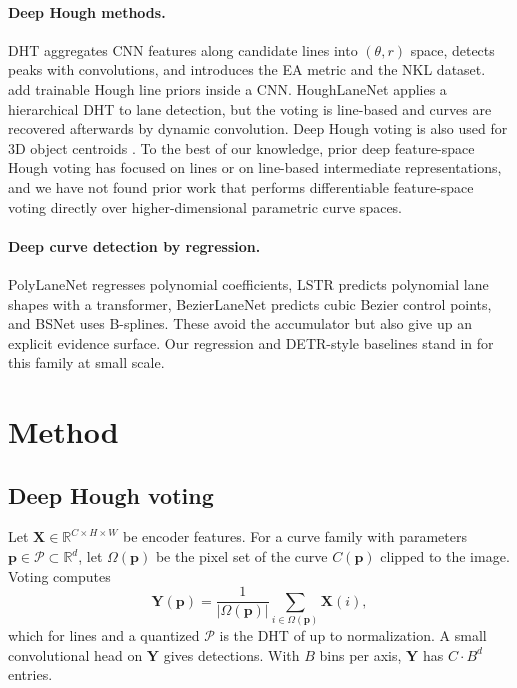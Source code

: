 \documentclass[11pt]{article}
\begin{document}
\paragraph{Deep Hough methods.}
DHT \citep{zhao2021deep} aggregates CNN features along candidate lines into $(\theta,r)$ space, detects peaks with convolutions, and introduces the EA metric and the NKL dataset. \citet{lin2020houghpriors} add trainable Hough line priors inside a CNN. HoughLaneNet \citep{houglanenet2023} applies a hierarchical DHT to lane detection, but the voting is line-based and curves are recovered afterwards by dynamic convolution. Deep Hough voting is also used for 3D object centroids \citep{qi2019votenet}. To the best of our knowledge, prior deep feature-space Hough voting has focused on lines or on line-based intermediate representations, and we have not found prior work that performs differentiable feature-space voting directly over higher-dimensional parametric curve spaces.

\paragraph{Deep curve detection by regression.}
PolyLaneNet \citep{polylanenet2020} regresses polynomial coefficients, LSTR \citep{lstr2021} predicts polynomial lane shapes with a transformer, BezierLaneNet \citep{feng2022bezier} predicts cubic Bezier control points, and BSNet \citep{bsnet2023} uses B-splines. These avoid the accumulator but also give up an explicit evidence surface. Our regression and DETR-style baselines \citep{detr2020} stand in for this family at small scale.

\section{Method}
\label{sec:method}

\subsection{Deep Hough voting}
Let $\mathbf{X}\in\mathbb{R}^{C\times H\times W}$ be encoder features. For a curve family with parameters $\mathbf{p}\in\mathcal{P}\subset\mathbb{R}^{d}$, let $\Omega(\mathbf{p})$ be the pixel set of the curve $C(\mathbf{p})$ clipped to the image. Voting computes
\begin{equation}
\mathbf{Y}(\mathbf{p})=\frac{1}{|\Omega(\mathbf{p})|}\sum_{i\in\Omega(\mathbf{p})}\mathbf{X}(i),
\label{eq:vote}
\end{equation}
which for lines and a quantized $\mathcal{P}$ is the DHT of \citet{zhao2021deep} up to normalization. A small convolutional head on $\mathbf{Y}$ gives detections. With $B$ bins per axis, $\mathbf{Y}$ has $C\cdot B^{d}$ entries.
\end{document}
